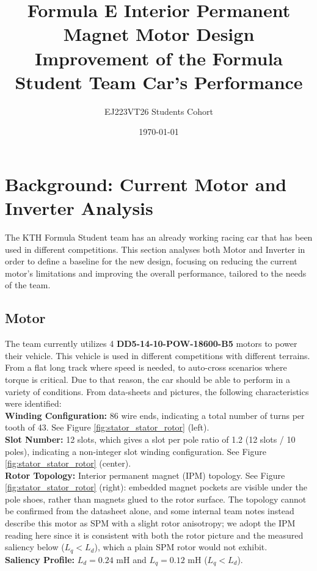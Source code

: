 \documentclass[11pt,a4paper]{article}
\title{
    \vspace{-2cm}
    \vspace{2cm}
    \textbf{Formula E Interior Permanent Magnet Motor Design} \\
    \large Improvement of the Formula Student Team Car's Performance
}
\author{EJ223VT26 Students Cohort}
\date{\today}
\begin{document}
\maketitle
\newpage

\tableofcontents
\newpage

\section{Background: Current Motor and Inverter Analysis}
The KTH Formula Student team has an already working racing car that has been used in different competitions. This section analyses both Motor and Inverter in order to define a baseline for the new design, focusing on reducing the current motor's limitations and improving the overall performance, tailored to the needs of the team. 
\subsection{Motor}
\label{sec:current_motor_background}
The team currently utilizes 4 \textbf{DD5-14-10-POW-18600-B5} motors to power their vehicle. This vehicle is used in different competitions with different terrains. From a flat long track where speed is needed, to auto-cross scenarios where torque is critical. Due to that reason, the car should be able to perform in a variety of conditions. From data-sheets\cite{DatasheetDD5} and pictures, the following characteristics were identified:
\\\textbf{Winding Configuration:} 86 wire ends, indicating a total number of turns per tooth of 43. See Figure \ref{fig:stator_stator_rotor} (left).
\\\textbf{Slot Number:} 12 slots, which gives a slot per pole ratio of 1.2 (12 slots / 10 poles), indicating a non-integer slot winding configuration. See Figure \ref{fig:stator_stator_rotor} (center).
\\\textbf{Rotor Topology:} Interior permanent magnet (IPM) topology. See Figure \ref{fig:stator_stator_rotor} (right): embedded magnet pockets are visible under the pole shoes, rather than magnets glued to the rotor surface. The topology cannot be confirmed from the datasheet alone, and some internal team notes instead describe this motor as SPM with a slight rotor anisotropy; we adopt the IPM reading here since it is consistent with both the rotor picture and the measured saliency below ($L_q<L_d$), which a plain SPM rotor would not exhibit.
\\\textbf{Saliency Profile:} $L_d = 0.24$ mH and $L_q = 0.12$ mH ($L_q < L_d$).
\end{document}
